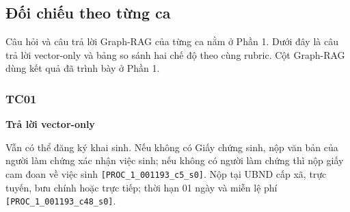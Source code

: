 \documentclass[11pt,a4paper]{article}
\newcommand{\src}[1]{\texttt{#1}}
\begin{document}
\subsection{Đối chiếu theo từng ca}

Câu hỏi và câu trả lời Graph-RAG của từng ca nằm ở Phần 1. Dưới đây là câu trả lời vector-only và bảng so sánh hai chế độ theo cùng rubric. Cột Graph-RAG dùng kết quả đã trình bày ở Phần 1.

\subsubsection*{TC01}
\textbf{Trả lời vector-only}\par\nobreak
\begin{answerbox}
Vẫn có thể đăng ký khai sinh. Nếu không có Giấy chứng sinh, nộp văn bản của người làm chứng xác nhận việc sinh; nếu không có người làm chứng thì nộp giấy cam đoan về việc sinh \src{[PROC\_1\_001193\_c5\_s0]}. Nộp tại UBND cấp xã, trực tuyến, bưu chính hoặc trực tiếp; thời hạn 01 ngày và miễn lệ phí \src{[PROC\_1\_001193\_c48\_s0]}.
\end{answerbox}
\end{document}
